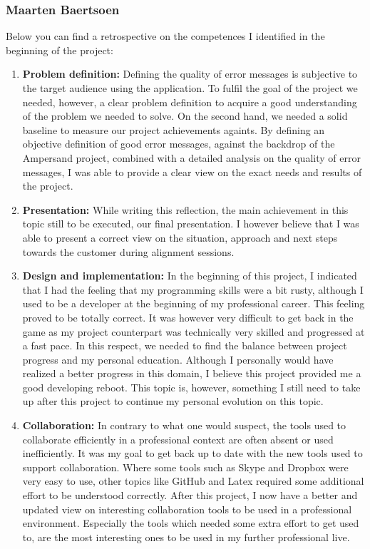 \subsubsection{Maarten Baertsoen}
Below you can find a retrospective on the competences I identified in the beginning of the project:
\begin{enumerate}
    \item \textbf{Problem definition:}
        Defining the quality of error messages is subjective to the target audience using the application.
		To fulfil the goal of the project we needed, however, a clear problem definition to acquire a good understanding of the problem we needed to solve.
		On the second hand, we needed a solid baseline to measure our project achievements againts.
		By defining an objective definition of good error messages, against the backdrop of the Ampersand project, combined with a detailed analysis on the quality of error messages, I was able to  provide a clear view on the exact needs and results of the project.
        
    \item \textbf{Presentation:}
        While writing this reflection, the main achievement in this topic still to be executed, our final presentation.
		I however believe that I was able to present a correct view on the situation, approach and next steps towards the customer during alignment sessions.

    \item \textbf{Design and implementation:}
        In the beginning of this project, I indicated that I had the feeling that my programming skills were a bit rusty, although I used to be a developer at the beginning of my professional career.
		This feeling proved to be totally correct.
		It was however very difficult to get back in the game as my project counterpart was technically very skilled and progressed at a fast pace.
		In this respect, we needed to find the balance between project progress and my personal education.
		Although I personally would have realized a better progress in this domain, I believe this project provided me a good developing reboot.
		This topic is, however, something I still need to take up after this project to continue my personal evolution on this topic.
		
    \item \textbf{Collaboration:}
        In contrary to what one would suspect, the tools used to collaborate efficiently in a professional context are often absent or used inefficiently.
        It was my goal to get back up to date with the new tools used to support collaboration.
		Where some tools such as Skype and Dropbox were very easy to use, other topics like GitHub and Latex required some additional effort to be understood correctly.
		After this project, I now have a better and updated view on interesting collaboration tools to be used in a professional environment. 
		Especially the tools which needed some extra effort to get used to, are the most interesting ones to be used in my further professional live.
		

\end{enumerate}

